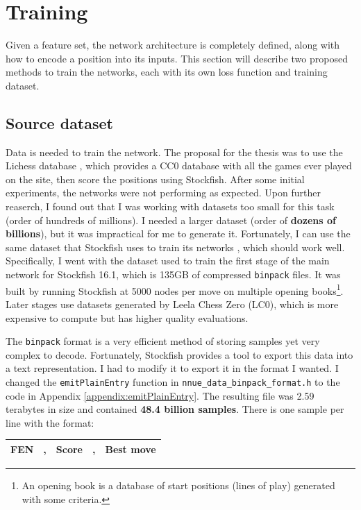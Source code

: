 \section{Training}

Given a feature set, the network architecture is completely defined, along with how to encode a position into its inputs. This section will describe two proposed methods to train the networks, each with its own loss function and training dataset.

\subsection{Source dataset}

Data is needed to train the network. The proposal for the thesis was to use the Lichess database \cite{lichessdb}, which provides a CC0 database with all the games ever played on the site, then score the positions using Stockfish. After some initial experiments, the networks were not performing as expected. Upon further reaserch, I found out that I was working with datasets too small for this task (order of hundreds of millions). I needed a larger dataset (order of \textbf{dozens of billions}), but it was impractical for me to generate it. Fortunately, I can use the same dataset that Stockfish uses to train its networks \cite{sf_nnue_dataset}, which should work well. Specifically, I went with the dataset used to train the first stage of the main network for Stockfish 16.1, which is 135GB of compressed \texttt{binpack} files. It was built by running Stockfish at 5000 nodes per move on multiple opening books\footnote{An opening book is a database of start positions (lines of play) generated with some criteria.}. Later stages use datasets generated by Leela Chess Zero (LC0), which is more expensive to compute but has higher quality evaluations.

The \texttt{binpack} format is a very efficient method of storing samples yet very complex to decode. Fortunately, Stockfish provides a tool to export this data into a text representation. I had to modify it to export it in the format I wanted. I changed the \texttt{emitPlainEntry} function in \texttt{nnue\_data\_binpack\_format.h} to the code in Appendix \ref{appendix:emitPlainEntry}. The resulting file was 2.59 terabytes in size and contained \textbf{48.4 billion samples}. There is one sample per line with the format:

\begin{center}
\begin{tabular}{|cp{0.0005cm}cp{0.0005cm}c|}
\hline
\textbf{FEN\footnotemark} & , & \textbf{Score} & , & \textbf{Best move} \\
\hline
\end{tabular}
\end{center}

